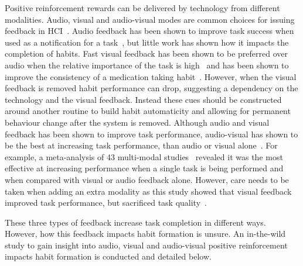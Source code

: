 \documentclass{scaffold/sigchi}
\begin{document}
Positive reinforcement rewards can be delivered by technology from different modalities. Audio, visual and audio-visual modes are common choices for issuing feedback in HCI~\cite{desinging_interface_speech_tech}. Audio feedback has been shown to improve task success when used as a notification for a task~\cite{auditory_notifications_increase_delivery_success}, but little work has shown how it impacts the completion of habits. Fast visual feedback has been shown to be preferred over audio when the relative importance of the task is high~\cite{visual_mode_better} and has been shown to improve the consistency of a medication taking habit~\cite{article_realtime_feedback_improving_medication_taking}. However, when the visual feedback is removed habit performance can drop, suggesting a dependency on the technology and the visual feedback. Instead these cues should be constructed around another routine to build habit automaticity and allowing for permanent behaviour change after the system is removed. Although audio and visual feedback has been shown to improve task performance, audio-visual has shown to be the best at increasing task performance, than audio or visual alone~\cite{benefits_of_audio_visual_1, benefits_of_audio_visual_2, chi_oussama_tap_the_shapetones}. For example, a meta-analysis of 43 multi-modal studies~\cite{comparing_modalities_effects_of_visual_auditory} revealed it was the most effective at increasing performance when a single task is being performed and when compared with visual or audio feedback alone. However, care needs to be taken when adding an extra modality as this study showed that visual feedback improved task performance, but sacrificed task quality~\cite{comparing_modalities_effects_of_visual_auditory}.

These three types of feedback increase task completion in different ways. However, how this feedback impacts habit formation is unsure. An in-the-wild study to gain insight into audio, visual and audio-visual positive reinforcement impacts habit formation is conducted and detailed below.
\end{document}
